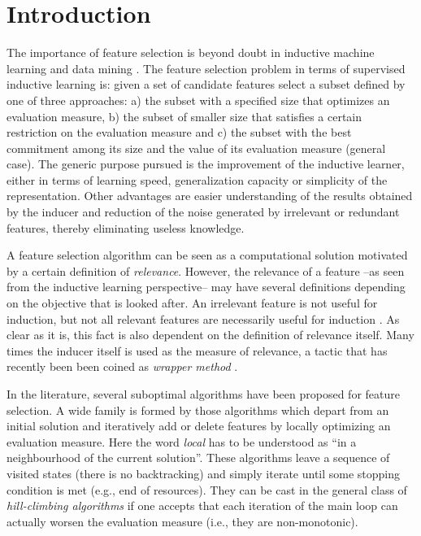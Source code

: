 \documentclass{article}
\begin{document}
\newpage
\tableofcontents
\newpage

\section{Introduction}
\label{section:Introduction}

The importance of feature selection is beyond doubt in inductive
machine learning and data mining \cite{LM98}. The feature
selection problem in terms of supervised inductive learning is: given
a set of candidate features select a subset defined by one of three
approaches: a) the subset with a specified size that optimizes an
evaluation measure, b) the subset of smaller size that satisfies a
certain restriction on the evaluation measure and c) the subset with
the best commitment among its size and the value of its evaluation
measure (general case). The generic purpose pursued is the improvement
of the inductive learner, either in terms of learning speed,
generalization capacity or simplicity of the representation. Other
advantages are easier understanding of the results obtained by the
inducer and reduction of the noise generated by irrelevant or
redundant features, thereby eliminating useless knowledge.


A feature selection algorithm can be seen as a computational solution
motivated by a certain definition of \emph{relevance}.  However, the
relevance of a feature --as seen from the inductive learning
perspective-- may have several definitions depending on the objective
that is looked after. An irrelevant feature is not useful for
induction, but not all relevant features are necessarily useful for
induction \cite{CF94b}. As clear as it is, this fact is also
dependent on the definition of relevance itself. Many times the
inducer itself is used as the measure of relevance, a tactic that has
recently been been coined as {\em wrapper method} \cite{JKP94}.

In the literature, several suboptimal algorithms have been proposed
for feature selection. A wide family is formed by those algorithms
which depart from an initial solution and iteratively add or delete
features by locally optimizing an evaluation measure. Here the word
{\em local} has to be understood as ``in a neighbourhood of the
current solution''. These algorithms leave a sequence of visited
states (there is no backtracking) and simply iterate until some stopping condition
is met (e.g., end of resources). They can be cast in the general class
of {\em hill-climbing algorithms} if one accepts that each iteration of the main loop can
actually worsen the evaluation measure (i.e., they are non-monotonic).
\end{document}
